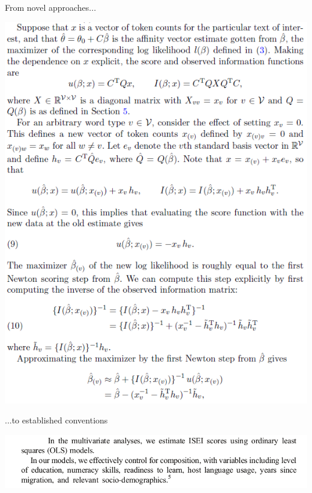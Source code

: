 \documentclass[10pt]{beamer}
\begin{document}
\begin{frame}{From novel approaches...}

    \includegraphics[height=0.9\textheight]{formula-heavy}
    \centering

\end{frame}

\begin{frame}{...to established conventions}

    \includegraphics[width=\textwidth]{formula-none}
    \centering

\end{frame}
\end{document}
